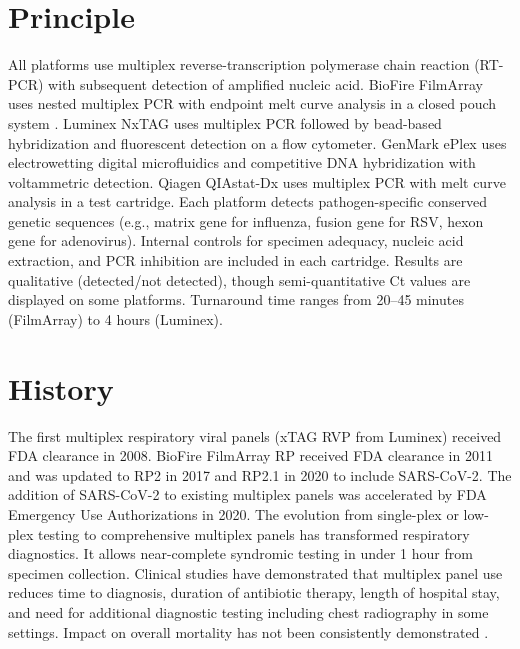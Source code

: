 \section*{Principle}
All platforms use multiplex reverse-transcription polymerase chain reaction (RT-PCR) with subsequent detection of amplified nucleic acid. BioFire FilmArray uses nested multiplex PCR with endpoint melt curve analysis in a closed pouch system \cite{leber2018multicenter}. Luminex NxTAG uses multiplex PCR followed by bead-based hybridization and fluorescent detection on a flow cytometer. GenMark ePlex uses electrowetting digital microfluidics and competitive DNA hybridization with voltammetric detection. Qiagen QIAstat-Dx uses multiplex PCR with melt curve analysis in a test cartridge. Each platform detects pathogen-specific conserved genetic sequences (e.g., matrix gene for influenza, fusion gene for RSV, hexon gene for adenovirus). Internal controls for specimen adequacy, nucleic acid extraction, and PCR inhibition are included in each cartridge. Results are qualitative (detected/not detected), though semi-quantitative Ct values are displayed on some platforms. Turnaround time ranges from 20--45 minutes (FilmArray) to 4 hours (Luminex).

\section*{History}
The first multiplex respiratory viral panels (xTAG RVP from Luminex) received FDA clearance in 2008. BioFire FilmArray RP received FDA clearance in 2011 and was updated to RP2 in 2017 and RP2.1 in 2020 to include SARS-CoV-2. The addition of SARS-CoV-2 to existing multiplex panels was accelerated by FDA Emergency Use Authorizations in 2020. The evolution from single-plex or low-plex testing to comprehensive multiplex panels has transformed respiratory diagnostics. It allows near-complete syndromic testing in under 1 hour from specimen collection. Clinical studies have demonstrated that multiplex panel use reduces time to diagnosis, duration of antibiotic therapy, length of hospital stay, and need for additional diagnostic testing including chest radiography in some settings. Impact on overall mortality has not been consistently demonstrated \cite{rogers2015impact,brendish2017routine}.

